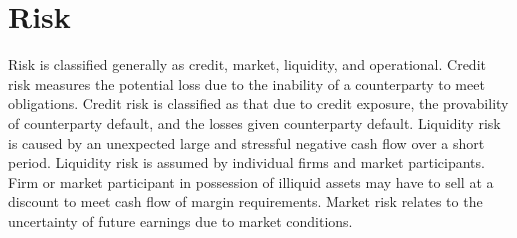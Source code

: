 %
%

\section{ Risk}
Risk is classified generally as credit, market, liquidity, and
operational.  Credit risk measures the potential loss due to
the inability of a counterparty to meet obligations.  Credit
risk is classified as that due to credit exposure, the
provability of counterparty default, and the losses given
counterparty default. Liquidity risk is caused by an unexpected
large and stressful negative cash flow over a short period.
Liquidity risk is assumed by individual firms and market
participants.  Firm or market participant in possession of
illiquid assets may have to sell at a discount to meet cash
flow of margin requirements.  Market risk relates to the
uncertainty of future earnings due to market conditions.


